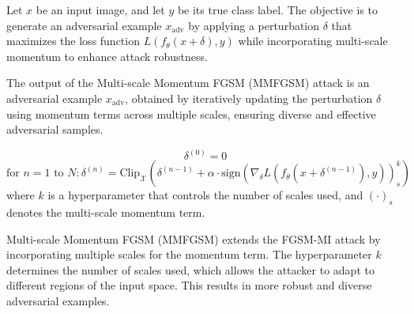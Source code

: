Let $x$ be an input image, and let $y$ be its true class label. The objective is to generate an adversarial example $x_{\text{adv}}$ by applying a perturbation $\delta$ that maximizes the loss function $L(f_\theta(x + \delta), y)$ while incorporating multi-scale momentum to enhance attack robustness.

The output of the Multi-scale Momentum FGSM (MMFGSM) attack is an adversarial example $x_{\text{adv}}$, obtained by iteratively updating the perturbation $\delta$ using momentum terms across multiple scales, ensuring diverse and effective adversarial samples.

\[
\delta^{(0)} = 0
\]
\[
\text{for } n = 1 \text{ to } N: 
    \delta^{(n)} = \text{Clip}_{\mathcal{X}} \left( \delta^{(n-1)} + \alpha \cdot \text{sign} \left( \nabla_\delta L(f_\theta(x + \delta^{(n-1)}), y) \right)_{s}^k \right)
\]
where $k$ is a hyperparameter that controls the number of scales used, and $\left(\cdot\right)_s$ denotes the multi-scale momentum term.

 Multi-scale Momentum FGSM (MMFGSM) extends the FGSM-MI attack by incorporating multiple scales for the momentum term. The hyperparameter $k$ determines the number of scales used, which allows the attacker to adapt to different regions of the input space. This results in more robust and diverse adversarial examples.